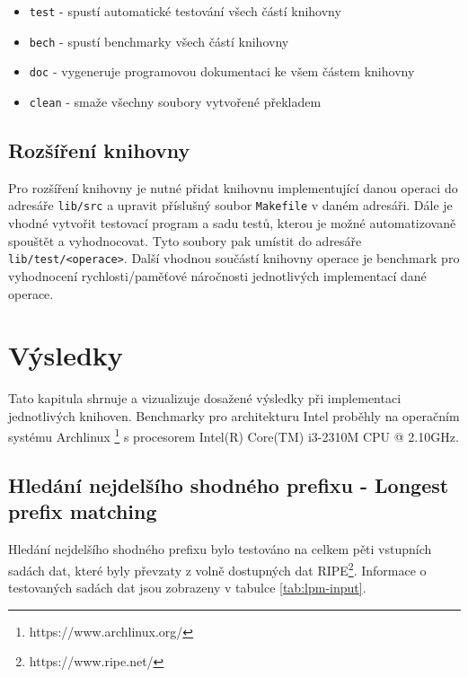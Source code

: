 \begin{itemize}
	\item{\texttt{test} - spustí automatické testování všech částí knihovny}
	\item{\texttt{bech} - spustí benchmarky všech částí knihovny}
	\item{\texttt{doc} - vygeneruje programovou dokumentaci ke všem částem knihovny}
	\item{\texttt{clean} - smaže všechny soubory vytvořené překladem}
\end{itemize}

\section{Rozšíření knihovny} %

Pro rozšíření knihovny je nutné přidat knihovnu implementující danou operaci
do adresáře \texttt{lib/src} a upravit příslušný soubor \texttt{Makefile} v daném adresáři.
Dále je vhodné vytvořit testovací program a sadu testů, kterou je možné automatizovaně spouštět a vyhodnocovat.
Tyto soubory pak umístit do adresáře \texttt{lib/test/<operace>}.
Další vhodnou součástí knihovny operace je benchmark pro vyhodnocení rychlosti/paměťové náročnosti jednotlivých
implementací dané operace.



\chapter{Výsledky}\label{chapter:results} %
Tato kapitula shrnuje a vizualizuje dosažené výsledky při implementaci jednotlivých knihoven.
Benchmarky pro architekturu Intel proběhly na operačním systému Archlinux \footnote{https://www.archlinux.org/} s procesorem Intel(R) Core(TM) i3-2310M CPU @ 2.10GHz.

\section{Hledání nejdelšího shodného prefixu - Longest prefix matching}\label{section:results-lpm} %

Hledání nejdelšího shodného prefixu bylo testováno na celkem pěti vstupních sadách dat, které
byly převzaty z volně dostupných dat RIPE\footnote{https://www.ripe.net/}.
Informace o testovaných sadách dat jsou zobrazeny v tabulce \ref{tab:lpm-input}.

